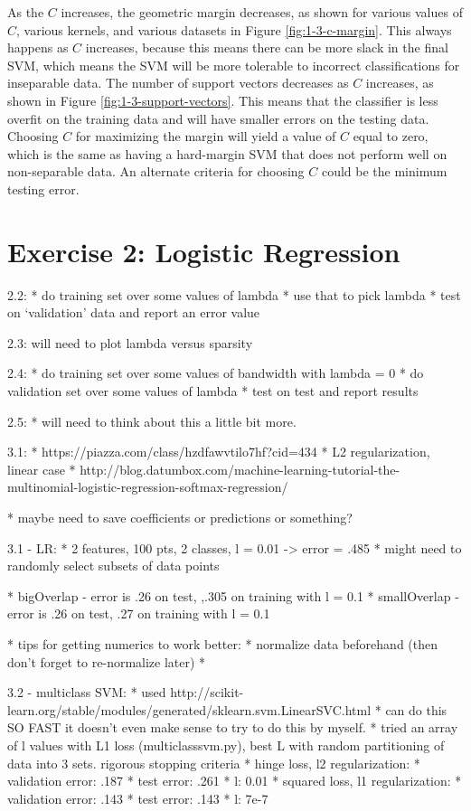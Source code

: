 \documentclass[10pt]{article}
\begin{document}
As the $C$ increases, the geometric margin decreases, as shown for various values of $C$, various kernels, and various datasets in Figure \ref{fig:1-3-c-margin}. This always happens as $C$ increases, because this means there can be more slack in the final SVM, which means the SVM will be more tolerable to incorrect classifications for inseparable data. The number of support vectors decreases as $C$ increases, as shown in Figure \ref{fig:1-3-support-vectors}. This means that the classifier is less overfit on the training data and will have smaller errors on the testing data. Choosing $C$ for maximizing the margin will yield a value of $C$ equal to zero, which is the same as having a hard-margin SVM that does not perform well on non-separable data. An alternate criteria for choosing $C$ could be the minimum testing error. 

\section{Exercise 2: Logistic Regression}

2.2: 
* do training set over some values of lambda
* use that to pick lambda
* test on `validation' data and report an error value

2.3:
will need to plot lambda versus sparsity

2.4:
* do training set over some values of bandwidth with lambda = 0
* do validation set over some values of lambda
* test on test and report results

2.5:
* will need to think about this a little bit more.

3.1:
* https://piazza.com/class/hzdfawvtilo7hf?cid=434
* L2 regularization, linear case
* http://blog.datumbox.com/machine-learning-tutorial-the-multinomial-logistic-regression-softmax-regression/

* maybe need to save coefficients or predictions or something?

3.1 - LR:
* 2 features, 100 pts, 2 classes, l = 0.01 -> error = .485
* might need to randomly select subsets of data points

* bigOverlap - error is .26 on test, ,.305 on training with l = 0.1
* smallOverlap - error is .26 on test, .27 on training with l = 0.1

* tips for getting numerics to work better:
	* normalize data beforehand (then don't forget to re-normalize later)
	* 

3.2 - multiclass SVM:
* used http://scikit-learn.org/stable/modules/generated/sklearn.svm.LinearSVC.html
* can do this SO FAST it doesn't even make sense to try to do this by myself.
* tried an array of l values with L1 loss (multiclasssvm.py), best L with random partitioning of data into 3 sets. rigorous stopping criteria
* hinge loss, l2 regularization: 
	* validation error: .187
	* test error: .261
	* l: 0.01
* squared loss, l1 regularization:
	* validation error: .143
	* test error: .143
	* l: 7e-7
\end{document}
